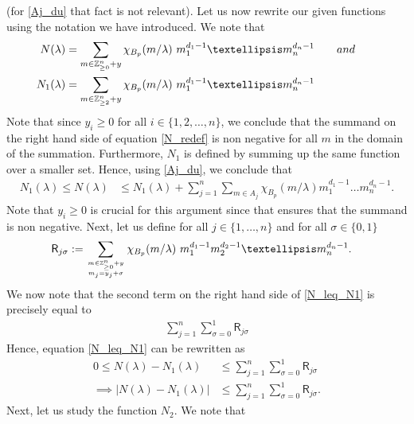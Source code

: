 \documentclass[11pt,lettersize,reqno,fullpage]{amsart}
\begin{document}
(for \eqref{Aj_du} that fact is not relevant). 
Let us now rewrite our given functions using the notation we have introduced. 
We note that 
\begin{align} 
N(\lambda) &= \sum_{m \in \mathbb{Z}^n_{\geq 0} + y} \chi_{B_p} (m/\lambda)\ m_1^{d_1-1} \ldots m_n^{d_n-1} 
\qquad \textnormal{and} \qquad \label{N_redef}\\  
N_1(\lambda)& = \sum_{m \in \mathbb{Z}^n_{\geq 2} + y} \chi_{B_p} (m/\lambda)\ m_1^{d_1-1} \ldots m_n^{d_n-1} 
\label{N1_redef}
\end{align} 
Note that since $y_i\geq 0$ for all $i \in \{1, 2, \ldots, n\}$, we conclude that the 
summand on the right hand side of equation \eqref{N_redef} is non negative for all $m$ in the 
domain of the summation. Furthermore, $N_1$ is defined by summing up the same function over a smaller 
set. Hence, using \eqref{Aj_du}, we conclude that 
\begin{align} 
N_1(\lambda) \leq N(\lambda) & \leq N_1(\lambda) + \sum_{j=1}^{n} \sum_{m\in A_j} \chi_{B_p}(m/\lambda) 
m_1^{d_1-1} \ldots m_n^{d_n-1}. \label{N_leq_N1} 
\end{align}
Note that $y_i\geq 0$ is crucial for this argument since that ensures that the summand is non negative. 
Next, let us define for all $j \in \{1, \ldots, n\}$ 
and for all $\sigma \in \{0, 1\}$  
\begin{align} 
\mathsf{R}_{j\sigma}&:= 
\sum_{{m \in \mathbb{Z}^{n}_{\geq 0} + y}\atop {m_j = y_j+\sigma}}\chi_{B_p}(m/\lambda) 
\ m_1^{d_1-1} m_2^{d_2-1} \ldots m_n^{d_n-1}. \label{R_i_sigma}
\end{align}
We now note that the second term on the right hand side of  
\eqref{N_leq_N1} is precisely equal to 
\begin{align*}
\sum_{j=1}^{n} \sum_{\sigma=0}^{1} \mathsf{R}_{j\sigma}
\end{align*}
Hence, equation \eqref{N_leq_N1} can be rewritten as 
\begin{align}
0 \leq N(\lambda) - N_1(\lambda) &\leq \sum_{j=1}^{n} \sum_{\sigma=0}^{1} \mathsf{R}_{j\sigma} \nonumber \\ 
\implies \big|N(\lambda) - N_1(\lambda)\big| &\leq \sum_{j=1}^{n} \sum_{\sigma=0}^{1} \mathsf{R}_{j\sigma}. 
\label{N_minus_N1}
\end{align}
Next, let us study the function $N_2$. We note that 
\end{document}
